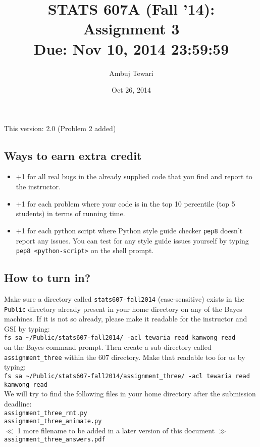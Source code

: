 \documentclass{article}
\begin{document}
\author{Ambuj Tewari}
\title{STATS 607A (Fall '14): Assignment 3\\
Due: Nov 10, 2014 23:59:59}
\date{Oct 26, 2014}

\maketitle

\begin{center}
This version: 2.0 (Problem 2 added)
\end{center}

\subsection*{Ways to earn extra credit}

\begin{itemize}
\item +1 for all real bugs in the already supplied code that you find and report to the instructor.
\item +1 for each problem where your code is in the top 10 percentile (top 5 students) in terms of running time.
\item +1 for each python script where Python style guide checker {\tt pep8} doesn't report any issues. You can test for any style guide issues yourself by typing
{\tt pep8 <python-script>} on the shell prompt.

\end{itemize}

\subsection*{How to turn in?}

Make sure a directory called {\tt stats607-fall2014} (case-sensitive) exists in the {\tt Public} directory already present in your home directory on any of the Bayes machines.
If it is not so already, please make it readable for the instructor and GSI by typing:\\
\verb#fs sa ~/Public/stats607-fall2014/ -acl tewaria read kamwong read# \\
on the Bayes command prompt. Then create a sub-directory called {\tt
assignment\_three} within the 607 directory. Make that readable too for us by typing:\\
\verb#fs sa ~/Public/stats607-fall2014/assignment_three/ -acl tewaria read kamwong read# \\
We will try to find the
following files in your home directory after the submission deadline:\\
{\tt assignment\_three\_rmt.py} \\
{\tt assignment\_three\_animate.py} \\
$\ll$ 1 more filename to be added in a later version of this document $\gg$\\
{\tt assignment\_three\_answers.pdf} \\
\end{document}
